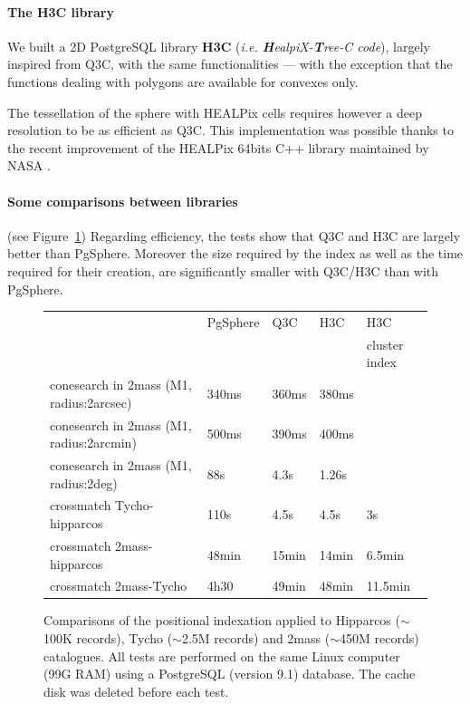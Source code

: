 \paragraph{The H3C library}

We built a 2D PostgreSQL library \textbf{H3C} (\textit{i.e. \textbf{H}ealpiX-\textbf{T}ree-C code}), largely inspired from  Q3C, with the same functionalities --- with the exception that the functions dealing with polygons are available for convexes only.

The tessellation of the sphere with HEALPix cells requires however a deep resolution to be as efficient as Q3C. This implementation was possible thanks to the recent improvement of the  HEALPix 64bits C++ library maintained by NASA \citep{gorski_healpix}.

\paragraph{Some comparisons between libraries} (see Figure~\ref{P044:comparative}) Regarding  efficiency, the tests show that Q3C and H3C are largely better than PgSphere. Moreover the size required by the index as well as the time required for their creation, are significantly smaller with Q3C/H3C than with PgSphere.

\begin{figure}[htp] \center
\begin{small}
\begin{tabular}{lllll}
 & PgSphere & Q3C & H3C & H3C  \\
 &          &     &     &{\scriptsize cluster index} \\
conesearch in 2mass (M1, radius:2arcsec) & 340ms& 360ms& 380ms &\\
conesearch in 2mass (M1, radius:2arcmin) & 500ms& 390ms& 400ms &\\
conesearch in 2mass (M1, radius:2deg)    & 88s& 4.3s& 1.26s &\\
crossmatch Tycho-hipparcos & 110s & 4.5s &  4.5s & 3s\\ 
crossmatch 2mass-hipparcos & 48min & 15min & 14min & 6.5min\\ 
crossmatch 2mass-Tycho     & 4h30 & 49min  & 48min & 11.5min\\ 
\end{tabular}
\end{small}
\caption{Comparisons of the positional indexation applied to Hipparcos ($\sim$100K records), Tycho ($\sim$2.5M records) and 2mass ($\sim$450M records) catalogues. All tests are performed on the same Linux computer (99G RAM) using a PostgreSQL (version 9.1) database. The cache disk was deleted before each test.}
\label{P044:comparative}
\end{figure}


